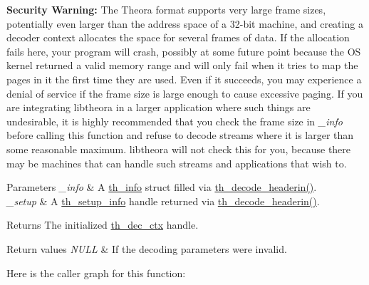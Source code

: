 {\bfseries Security Warning\+:} The Theora format supports very large frame sizes, potentially even larger than the address space of a 32-\/bit machine, and creating a decoder context allocates the space for several frames of data. If the allocation fails here, your program will crash, possibly at some future point because the O\+S kernel returned a valid memory range and will only fail when it tries to map the pages in it the first time they are used. Even if it succeeds, you may experience a denial of service if the frame size is large enough to cause excessive paging. If you are integrating libtheora in a larger application where such things are undesirable, it is highly recommended that you check the frame size in {\itshape \+\_\+info} before calling this function and refuse to decode streams where it is larger than some reasonable maximum. libtheora will not check this for you, because there may be machines that can handle such streams and applications that wish to. 
\begin{DoxyParams}{Parameters}
{\em \+\_\+info} & A \hyperlink{structth__info}{th\+\_\+info} struct filled via \hyperlink{group__decfuncs_ga006d01d36fbe64768c571e6a12b7fc50}{th\+\_\+decode\+\_\+headerin()}. \\
\hline
{\em \+\_\+setup} & A \hyperlink{structth__setup__info}{th\+\_\+setup\+\_\+info} handle returned via \hyperlink{group__decfuncs_ga006d01d36fbe64768c571e6a12b7fc50}{th\+\_\+decode\+\_\+headerin()}. \\
\hline
\end{DoxyParams}
\begin{DoxyReturn}{Returns}
The initialized \hyperlink{structth__dec__ctx}{th\+\_\+dec\+\_\+ctx} handle. 
\end{DoxyReturn}

\begin{DoxyRetVals}{Return values}
{\em N\+U\+L\+L} & If the decoding parameters were invalid. \\
\hline
\end{DoxyRetVals}


Here is the caller graph for this function\+:


